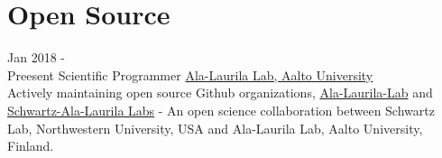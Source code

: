 \documentclass[letterpaper]{twentysecondcv} %
\begin{document}
\section{Open Source}
\begin{twenty}
	\twentyitem
	{Jan 2018 - \\Preesent}
	{Scientific Programmer}
	{\href{http://ala-laurila.biosci.helsinki.fi/}{Ala-Laurila Lab, Aalto University}}
	{}
	{
		{\\Actively maintaining open source Github organizations, \href{https://github.com/ala-laurila-lab}{Ala-Laurila-Lab} and \href{https://github.com/Schwartz-AlaLaurila-Labs/}{Schwartz-Ala-Laurila Labs} - An open science collaboration between Schwartz Lab, Northwestern University, USA and Ala-Laurila Lab, Aalto University, Finland.
			}
	}
\end{twenty}
\end{document}

